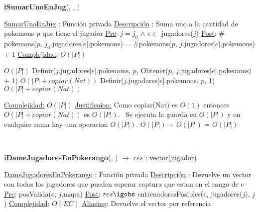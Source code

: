 \begin{Algoritmos}
\begin{algorithm}[H]
\begin{algorithmic}[1]
\end{algorithmic}
\end{algorithm}  
  


\begin{algorithm}[H]
{\textbf{iSumarUnoEnJug}(, ,  )}
\begin{algorithmic}[1]

\Statex \underline{SumarUnoEnJug} : Funci\'on privada 
\Statex \underline{Descripci\'on} : Suma uno a la cantidad de pokemons p que tiene el jugador 
\Statex \underline{Pre}: $j = j_0$ $\land$  $e \in$ jugadores($j$)
\Statex \underline{Post}: $\#$pokemons($p$, $j_0$.jugadores[$e$].pokemons) = $\#$pokemons($p$, $j$.jugadores[$e$].pokemons) + 1
\Statex \underline{Complejidad}: $O(|P|)$ 

 \Comment $O(|P|)$
  \State Definir($j$.jugadores[$e$].pokemons, $p$, Obtener($p$, $j$.jugadores[$e$].pokemons) + 1) \Comment $O(|P| + copiar(Nat))$
\Else
  \State Definir($j$.jugadores[$e$].pokemons, $p$, 1)  \Comment $O(|P| + copiar(Nat))$
\EndIf


\medskip
\Statex \underline{Complejidad:} $O(|P|)$
\Statex \underline{Justificaion:} Como copiar(Nat) es $O(1)$ entonces $O(|P| + copiar(Nat))$ es $O(|P|)$. \ Se ejecuta la guarda en $O(|P|)$ y en cualquier rama hay una operacion $O(|P|)$. $O(|P|)$ + $O(|P|)$ = $O(|P|)$

\end{algorithmic}
\end{algorithm}  
  

$ $\newline
$ $\newline
$ $\newline



{\textbf{iDameJugadoresEnPokerango}(, ) $\to$ $res$ : vector(jugador)}
\begin{algorithmic}[1]

\Statex \underline{DameJugadoresEnPokerango} : Funci\'on privada 
\Statex \underline{Descripci\'on} : Devuelve un vector con todos los jugadores que pueden esperar captura que estan en el rango de c 
\Statex \underline{Pre}: posValida($c$, $j$.mapa)
\Statex \underline{Post}: $res \igobs$ entrenadoresPosibles($c$, jugadores($j$), $j$)
\Statex \underline{Complejidad}: $O(EC)$ 
\Statex \underline{Aliasing}: Devuelve el vector por referencia 


\end{algorithmic}
\end{Algoritmos}
